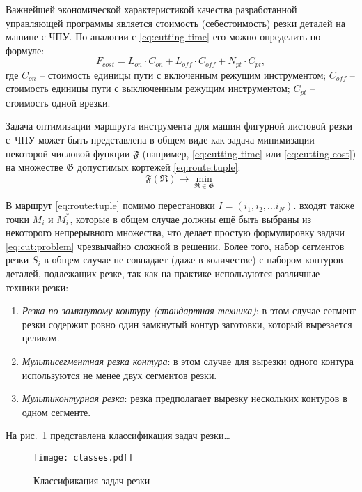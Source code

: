 Важнейшей экономической характеристикой качества
разработанной управляющей программы является стоимость
(себестоимость) резки деталей на машине с ЧПУ.
По аналогии с \eqref{eq:cutting-time}
его можно определить по формуле:
\begin{equation}
  F_{cost}=
  L_{on} \cdot C_{on} +
  L_{off} \cdot C_{off} +
  N_{pt} \cdot C_{pt}
  ,
  \label{eq:cutting-cost}
\end{equation}
где
$C_{on}$ -- стоимость единицы пути с включенным режущим инструментом;
$C_{off}$ -- стоимость единицы пути с выключенным режущим инструментом;
$C_{pt}$ -- стоимость одной врезки.

Задача оптимизации маршрута инструмента для машин фигурной листовой резки с~ЧПУ
может быть представлена в общем виде
как задача минимизации некоторой числовой функции
$\mathfrak F$
(например, \eqref{eq:cutting-time} или \eqref{eq:cutting-cost})
на множестве
$\mathfrak G$ допустимых кортежей
\eqref{eq:route:tuple}:
\begin{equation}
  \mathfrak F(\mathfrak R) \to \min_{\mathfrak R \in \mathfrak G}
  \label{eq:cut:problem}
\end{equation}

В маршрут \eqref{eq:route:tuple} помимо перестановки
$I = (i_1, i_2, ... i_N)$.
входят также точки $M_i$ и $M_i^*$,
которые в общем случае должны ещё быть выбраны
из некоторого непрерывного множества,
что делает простую формулировку задачи \eqref{eq:cut:problem}
чрезвычайно сложной в решении.
Более того,
набор сегментов резки $S_i$
в общем случае не совпадает
(даже в количестве)
с набором контуров деталей,
подлежащих резке,
так как на практике используются различные техники резки:
\begin{enumerate}
  \item
  {\it Резка по замкнутому контуру (стандартная техника)}:
  в этом случае сегмент резки содержит
  ровно один замкнутый контур заготовки,
  который вырезается целиком.
  \item
  {\it Мультисегментная резка контура}:
  в этом случае для вырезки одного контура
  используются не менее двух сегментов резки.
  \item
  {\it Мультиконтурная резка}:
  резка предполагает вырезку нескольких
  контуров в одном сегменте.
\end{enumerate}

На рис.~\ref{fig:cut-classes}
представлена классификация задач резки\dots


\begin{figure}
  \centering
  \texttt{[image: classes.pdf]}
  \caption{Классификация задач резки}
  \label{fig:cut-classes}
\end{figure}
